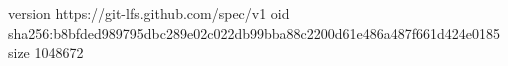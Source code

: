 version https://git-lfs.github.com/spec/v1
oid sha256:b8bfded989795dbc289e02c022db99bba88c2200d61e486a487f661d424e0185
size 1048672
